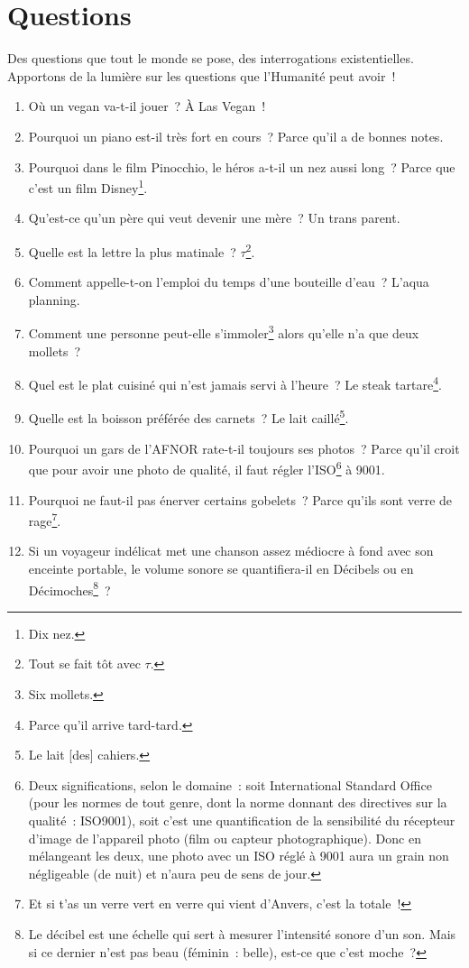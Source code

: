 \documentclass[10pt,a5paper,fullpage]{book}
\begin{document}
	\chapter{Questions}
	Des questions que tout le monde se pose, des interrogations existentielles.\\ Apportons de la lumière sur les questions que l'Humanité peut avoir~!
	\newpage
	\begin{enumerate}
		\item Où un vegan va-t-il jouer~? À Las Vegan~!
		\item Pourquoi un piano est-il très fort en cours~? Parce qu’il a de bonnes notes.
		\item Pourquoi dans le film Pinocchio, le héros a-t-il un nez aussi long~? Parce que c’est un film Disney\footnote{Dix nez.}.
		\item Qu’est-ce qu’un père qui veut devenir une mère~? Un trans parent.
		\item Quelle est la lettre la plus matinale~? $\tau$\footnote{Tout se fait tôt avec $\tau$.}.
		\item Comment appelle-t-on l’emploi du temps d’une bouteille d’eau~? L’aqua planning. 
		\item Comment une personne peut-elle s’immoler\footnote{Six mollets.} alors qu’elle n’a que deux mollets~?
		\item Quel est le plat cuisiné qui n’est jamais servi à l’heure~? Le steak tartare\footnote{Parce qu'il arrive tard-tard.}. 
		\item Quelle est la boisson préférée des carnets~? Le lait caillé\footnote{Le lait [des] cahiers.}.
		\item Pourquoi un gars de l'AFNOR rate-t-il toujours ses photos~? Parce qu'il croit que pour avoir une photo de qualité, il faut régler l'ISO\footnote{Deux significations, selon le domaine~: soit International Standard Office (pour les normes de tout genre, dont la norme donnant des directives sur la qualité~: ISO9001), soit c'est une quantification de la sensibilité du récepteur d'image de l'appareil photo (film ou capteur photographique). Donc en mélangeant les deux, une photo avec un ISO réglé à 9001 aura un grain non négligeable (de nuit) et n'aura peu de sens de jour.} à 9001. 
		\item Pourquoi ne faut-il pas énerver certains gobelets~? Parce qu’ils sont verre de rage\footnote{Et si t’as un verre vert en verre qui vient d’Anvers, c’est la totale~!}.
		\item Si un voyageur indélicat met une chanson assez médiocre à fond avec son enceinte portable, le volume sonore se quantifiera-il en Décibels ou en Décimoches\footnote{Le décibel est une échelle qui sert à mesurer l'intensité sonore d’un son. Mais si ce dernier n’est pas beau (féminin~: belle), est-ce que c’est moche~?}~?

\end{enumerate}
\end{document}
